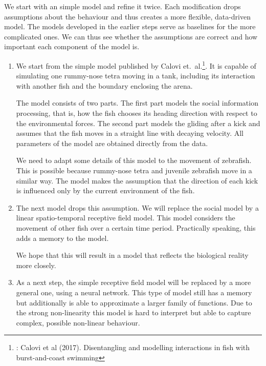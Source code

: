 \documentclass[11pt]{article}
\begin{document}
We start with an simple model and refine it twice.
Each modification drops assumptions about the behaviour and thus creates a more flexible, data-driven model.
The models developed in the earlier steps serve as baselines for the more complicated ones.
We can thus see whether the assumptions are correct and how important each component of the model is.
\begin{enumerate}
\item We start from the simple model published by Calovi et.\ al.\footnote{: Calovi et al (2017). Disentangling and modelling interactions in fish with burst-and-coast swimming}.
It is capable of simulating one rummy-nose tetra moving in a tank, including its interaction with another fish and the boundary enclosing the arena.

The model consists of two parts.
The first part models the social information processing, that is, how the fish chooses its heading direction with respect to the environmental forces.
The second part models the gliding after a kick and assumes that the fish moves in a straight line with decaying velocity.
All parameters of the model are obtained directly from the data.

We need to adapt some details of this model to the movement of zebrafish.
This is possible because rummy-nose tetra and juvenile zebrafish move in a similar way.
The model makes the assumption that the direction of each kick is influenced only by the current environment of the fish.
\item The next model drops this assumption.
We will replace the social model by a linear spatio-temporal receptive field model.
This model considers the movement of other fish over a certain time period.
Practically speaking, this adds a memory to the model.

We hope that this will result in a model that reflects the biological reality more closely.
\item As a next step, the simple receptive field model will be replaced by a more general one, using a neural network.
This type of model still has a memory but additionally is able to approximate a larger family of functions.
Due to the strong non-linearity this model is hard to interpret but able to capture complex, possible non-linear behaviour.
\end{enumerate}
\end{document}
